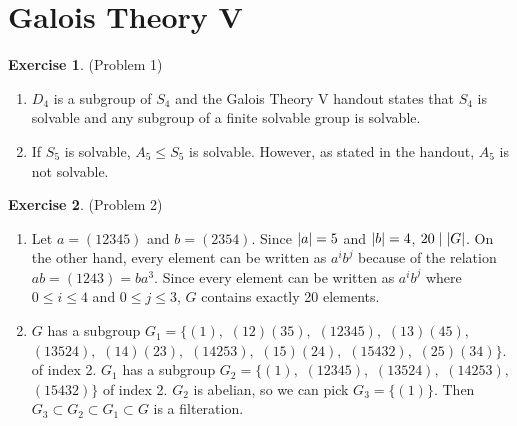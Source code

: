 \documentclass[12pt, psamsfonts]{amsart}
\theoremstyle{definition}
\newtheorem*{exer}{Exercise}
\theoremstyle{remark}
\numberwithin{equation}{section}
\begin{document}
\section{Galois Theory V}

\begin{exer}{(Problem 1)}
  \begin{enumerate}[label=(\roman*)]
    \item 
      $D_4$ is a subgroup of $S_4$ and the Galois Theory V handout states that $S_4$ is solvable and any subgroup of a finite solvable group is solvable.
    \item
      If $S_5$ is solvable, $A_5 \leq S_5$ is solvable.
      However, as stated in the handout, $A_5$ is not solvable.
  \end{enumerate}
\end{exer}

\begin{exer}{(Problem 2)}
  \begin{enumerate}[label=(\roman*)]
    \item 
      Let $a = (12345)$ and $b = (2354)$.
      Since $\abs{a} = 5$ and $\abs{b} = 4$, $20 \mid \abs{G}$.
      On the other hand, every element can be written as $a^ib^j$ because of the relation $ab = (1243) = ba^3$.
      Since every element can be written as $a^ib^j$ where $0 \leq i \leq 4$ and $0 \leq j \leq 3$, $G$ contains exactly 20 elements.
    \item
      $G$ has a subgroup $G_1 = \{(1),$ $(12)(35),$ $(12345),$ $(13)(45),$ $(13524),$ $(14)(23),$ $(14253),$ $(15)(24),$ $(15432),$ $(25)(34)\}$.
      of index 2.
      $G_1$ has a subgroup $G_2 = \{(1),$ $(12345),$ $(13524),$ $(14253),$ $(15432)\}$ of index 2.
      $G_2$ is abelian, so we can pick $G_3 = \{(1)\}$.
      Then $G_3 \subset G_2 \subset G_1 \subset G$ is a filteration. 
  \end{enumerate}
\end{exer}
\end{document}
